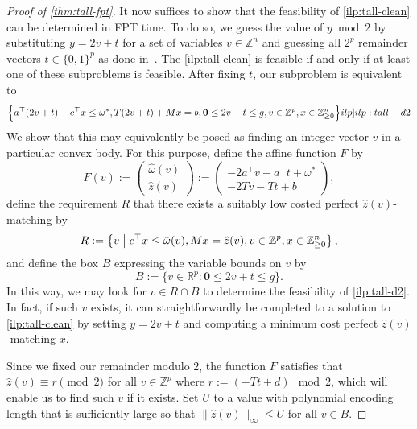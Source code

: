 \documentclass[a4paper,UKenglish,cleveref,thm-restate]{lipics-v2021}
\newcommand{\R}{\mathbb R}
\newcommand{\Z}{\mathbb Z}
\newcommand{\veczero}{\mathbf0}
\begin{document}
\begin{proof}[Proof of \cref{thm:tall-fpt}]
    It now suffices to show that the feasibility of \cref{ilp:tall-clean} can be determined in FPT time. To do so, we guess the value of $y\bmod2$ by substituting $y=2v+t$ for a set of variables $v\in\Z^n$ and guessing all $2^p$ remainder vectors $t\in\{0,1\}^p$ as done in~\cite{DBLP:conf/soda/CslovjecsekKLPP24}. The \cref{ilp:tall-clean} is feasible if and only if at least one of these subproblems is feasible. After fixing $t$, our subproblem is equivalent to
    \begin{equation}
        \Bigl\{a^\top(2v+t)+c^\top x\le\omega^*,T(2v+t)+Mx=b,\veczero\le2v+t\le g,v\in\Z^p,x\in\mathbb Z_{\ge0}^n\Bigr\}
        \label[ilp]{ilp:tall-d2}
    \end{equation}
    We show that this may equivalently be posed as finding an integer vector $v$ in a particular convex body. For this purpose, define the affine function $F$ by
    \[
        F(v):=\begin{pmatrix}
            \hat\omega(v)\\
            \hat z(v)
        \end{pmatrix}:=\begin{pmatrix}
            -2a^\top v-a^\top t+\omega^*\\
            -2Tv-Tt+b
        \end{pmatrix},
    \]
    define the requirement $R$ that there exists a suitably low costed perfect $\hat z(v)$-matching by
    \[
        R:=\left\{v\bigm\vert c^\top x\le\hat\omega(v),Mx=\hat z(v),v\in\Z^p,x\in\mathbb Z_{\ge0}^n\right\},
    \]
    and define the box $B$ expressing the variable bounds on $v$ by
    \[
        B:=\bigl\{v\in\R^p\colon\veczero\le 2v+t\le g\bigr\}.
    \]
    In this way, we may look for $v\in R\cap B$ to determine the feasibility of \cref{ilp:tall-d2}. In fact, if such $v$ exists, it can straightforwardly be completed to a solution to \cref{ilp:tall-clean} by setting $y=2v+t$ and computing a minimum cost perfect $\hat z(v)$-matching $x$.
    
    Since we fixed our remainder modulo $2$, the function $F$ satisfies that $\hat z(v)\equiv r\pmod2$ for all $v\in\Z^p$ where $r:=(-Tt+d)\mod2$, which will enable us to find such $v$ if it exists. Set $U$ to a value with polynomial encoding length that is sufficiently large so that $\|\hat z(v)\|_\infty\le U$ for all $v\in B$.


\end{proof}
\end{document}
